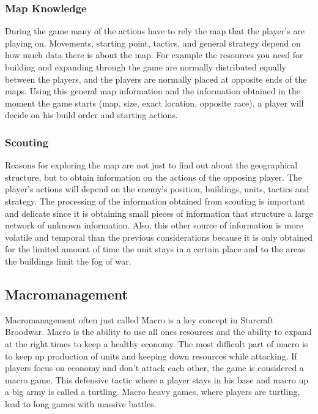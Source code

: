 			\subsubsection{Map Knowledge}
				During the game many of the actions have to rely the map that the player's are playing on. Movements, starting point, 
				tactics, and general strategy depend on how much data there is about the map. 				
				For example the resources you need for building and expanding through the game are normally distributed
				equally between the players, and the players are normally placed at opposite ends of the maps. 
				Using this general map information and the information obtained in the moment the game starts 
				(map, size, exact location, opposite race), a player will decide on his build order and starting actions. 
		
			\subsubsection{Scouting}
				Reasons for exploring the map are not just to find out about the geographical structure, 
				but to obtain information on the actions of the opposing player. The player's actions will depend on
				the enemy's position, buildings, units, tactics and strategy. The processing of the information 
				obtained from scouting is important and delicate since it is obtaining small pieces of information 
				that structure a large network of unknown information. Also, this other source of information 
				is more volatile and temporal than the previous considerations because it is only obtained for the 
				limited amount of time the unit stays in a certain place and to the areas the buildings limit the fog of war.
				
	\subsection{Macromanagement}
		Macromanagement often just called Macro is a key concept in Starcraft Broodwar. 
		Macro is the ability to use all ones resources and the ability to expand at the right times to keep a healthy economy.
		The most difficult part of macro is to keep up production of units and keeping down resources while attacking.
		If players focus on economy and don't attack each other, the game is considered a macro game. This defensive tactic where a
		player stays in his base and macro up a big army is called a turtling. Macro heavy games, where players are turtling, lead to
		long games with massive battles. 
			
